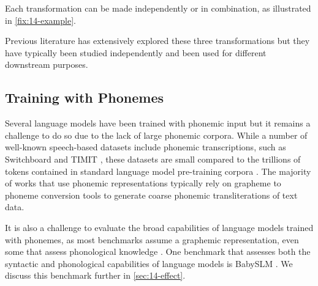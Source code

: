 

\noindent
Each transformation can be made independently or in combination, as illustrated in \cref{fix:14-example}. %

Previous literature has extensively explored these three transformations but they have typically been studied independently and been used for different downstream purposes. 

\subsection{Training with Phonemes}

Several language models have been trained with phonemic input \citep{sundararaman-2021-phonemebert, gale-etal-2023-bort} but it remains a challenge to do so due to the lack of large phonemic corpora. While a number of well-known speech-based datasets include phonemic transcriptions, such as Switchboard \citep{godfrey1992switchboard} and TIMIT \citep{garofolo1993darpa}, these datasets are small compared to the trillions of tokens contained in standard language model pre-training corpora \citep{elazar-2024-redpajama}. The majority of works that use phonemic representations typically rely on grapheme to phoneme conversion tools \citep{bisani-2008-g2p, hasegawa-2020-g2pmultilingual} to generate coarse phonemic transliterations of text data.

It is also a challenge to evaluate the broad capabilities of language models trained with phonemes, as most benchmarks assume a graphemic representation, even some that assess phonological knowledge \citep{suvarna-etal-2024-phonologybench}. One benchmark that assesses both the syntactic and phonological capabilities of language models is BabySLM \citep{lavechin}. %
We discuss this benchmark further in \cref{sec:14-effect}.

